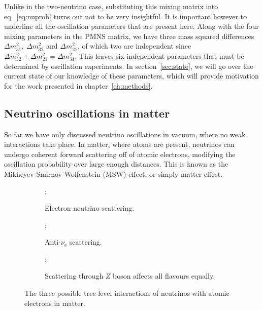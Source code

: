 Unlike in the two-neutrino case, substituting this mixing matrix into
eq.~\ref{eq:nuprob} turns out not to be very insightful. It is important
however to underline all the oscillation parameters that are present here.
Along with the four mixing parameters in the PMNS matrix, we have three mass
squared differences $\Delta m^2_{31},~\Delta m^2_{32}$ and $\Delta m^2_{21}$,
of which two are independent since $\Delta m^2_{32} + \Delta m^2_{21} = \Delta
m^2_{31}$. This leaves six independent
parameters that must be determined by oscillation experiments.
In section~\ref{sec:state}, we will go over the current state of our knowledge
of these parameters, which will provide motivation for the work presented in
chapter~\ref{ch:methods}.


\subsection{Neutrino oscillations in matter}
So far we have only discussed neutrino oscillations in vacuum, where no weak
interactions take place.
In matter, where atoms are present, neutrinos can undergo coherent forward
scattering off of atomic electrons, modifying the oscillation probability over
large enough distances. This is known as the Mikheyev-Smirnov-Wolfenstein (MSW)
effect\cite{wolfenstein, mikheyev-smirnov}, or simply matter effect.
\begin{figure}
	\centering
	\begin{subfigure}{0.3\textwidth}
		\centering
	;
		\caption{Electron-neutrino scattering.}
		\label{fig:nu_e-scatter}
	\end{subfigure}
	\begin{subfigure}{0.3\textwidth}
		\centering
		;
			\caption{Anti-$\nu_e$ scattering.}
			\label{fig:anti-nu_e-scatter}
	\end{subfigure}
	\begin{subfigure}{0.3\textwidth}
		\centering
		;
		\caption{Scattering through $Z$ boson affects all flavours equally.}
		\label{fig:z-scatter}
	\end{subfigure}
	\caption{The three possible tree-level interactions of neutrinos with atomic
	electrons in matter.}
\label{fig:forward_scatter}
\end{figure}

